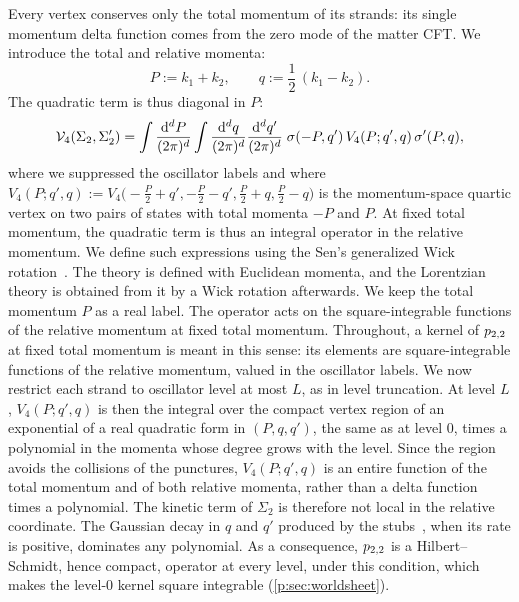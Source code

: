 Every vertex conserves only the total momentum of its strands: its single momentum delta function comes from the zero mode of the matter CFT.
We introduce the total and relative momenta:
\begin{equation}
  \label{p:eq:hs4:momenta}
  P
    := k_1 + k_2,
  \qquad
  q
    := \frac{1}{2} \, (k_1 - k_2).
\end{equation}
The quadratic term is thus diagonal in $P$:
\begin{equation}
  \label{p:eq:hs4:diagonal}
  \mathcal{V}_{4}(\Sigma_2, \Sigma_2')
    = \int \frac{\mathrm{d}^d P}{(2\pi)^d}
      \int \frac{\mathrm{d}^d q}{(2\pi)^d} \frac{\mathrm{d}^d q'}{(2\pi)^d} \;
      \sigma(- P, q') \, V_4(P; q', q) \, \sigma'(P, q),
\end{equation}
where we suppressed the oscillator labels and where $V_4(P; q', q) := V_4\big(- \tfrac{P}{2} + q', - \tfrac{P}{2} - q', \tfrac{P}{2} + q, \tfrac{P}{2} - q\big)$ is the momentum-space quartic vertex on two pairs of states with total momenta $- P$ and $P$.
At fixed total momentum, the quadratic term is thus an integral operator in the relative momentum.
We define such expressions using the Sen's generalized Wick rotation~\cite{Pius:2016:CutkoskyRulesSuperstring,deLacroix:2017:ClosedSuperstringField,Erbin:2021:StringFieldTheory,Bautista:2019:QuantumGravityTimelike}.
The theory is defined with Euclidean momenta, and the Lorentzian theory is obtained from it by a Wick rotation afterwards.
We keep the total momentum $P$ as a real label.
The operator acts on the square-integrable functions of the relative momentum at fixed total momentum.
Throughout, a kernel of $p_{2,2}$ at fixed total momentum is meant in this sense: its elements are square-integrable functions of the relative momentum, valued in the oscillator labels.
We now restrict each strand to oscillator level at most $L$, as in level truncation.
At level $L$, $V_4(P; q', q)$ is then the integral over the compact vertex region of an exponential of a real quadratic form in $(P, q, q')$, the same as at level $0$, times a polynomial in the momenta whose degree grows with the level.
Since the region avoids the collisions of the punctures, $V_4(P; q', q)$ is an entire function of the total momentum and of both relative momenta, rather than a delta function times a polynomial.
The kinetic term of $\Sigma_2$ is therefore not local in the relative coordinate.
The Gaussian decay in $q$ and $q'$ produced by the stubs~\cite{Sonoda:1990:ClosedStringField}, when its rate is positive, dominates any polynomial.
  As a consequence, $p_{2,2}$ is a Hilbert--Schmidt, hence compact, operator at every level, under this condition, which makes the level-$0$ kernel square integrable (\cref{p:sec:worldsheet}).

